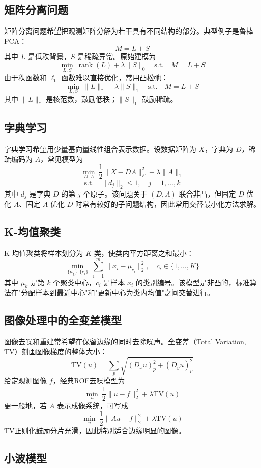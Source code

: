 \subsection{矩阵分离问题}

矩阵分离问题希望把观测矩阵分解为若干具有不同结构的部分。典型例子是鲁棒PCA：
\[
M=L+S
\]
其中 $L$ 是低秩背景，$S$ 是稀疏异常。原始建模为
\[
\min_{L,S}\ \operatorname{rank}(L)+\lambda\|S\|_0
\quad \text{s.t.}\quad M=L+S
\]
由于秩函数和 $\ell_0$ 函数难以直接优化，常用凸松弛：
\[
\min_{L,S}\ \|L\|_*+\lambda\|S\|_1
\quad \text{s.t.}\quad M=L+S
\]
其中 $\|L\|_*$ 是核范数，鼓励低秩；$\|S\|_1$ 鼓励稀疏。

\subsection{字典学习}

字典学习希望用少量基向量线性组合表示数据。设数据矩阵为 $X$，字典为 $D$，稀疏编码为 $A$，常见模型为
\[
\min_{D,A}\ \frac{1}{2}\|X-DA\|_F^2+\lambda\|A\|_1
\]
\[
\text{s.t.}\quad \|d_j\|_2\leq1,\quad j=1,\ldots,k
\]
其中 $d_j$ 是字典 $D$ 的第 $j$ 个原子。该问题关于 $(D,A)$ 联合非凸，但固定 $D$ 优化 $A$、固定 $A$ 优化 $D$ 时常有较好的子问题结构，因此常用交替最小化方法求解。

\subsection{K-均值聚类}

K-均值聚类将样本划分为 $K$ 类，使类内平方距离之和最小：
\[
\min_{\{\mu_k\},\{c_i\}}\ \sum_{i=1}^{m}\|x_i-\mu_{c_i}\|_2^2,\quad c_i\in\{1,\ldots,K\}
\]
其中 $\mu_k$ 是第 $k$ 个聚类中心，$c_i$ 是样本 $x_i$ 的类别编号。该模型是非凸的，标准算法在"分配样本到最近中心"和"更新中心为类内均值"之间交替进行。

\subsection{图像处理中的全变差模型}

图像去噪和重建常希望在保留边缘的同时去除噪声。全变差（Total Variation, TV）刻画图像梯度的整体大小：
\[
\mathrm{TV}(u)=\sum_p \sqrt{(D_xu)_p^2+(D_yu)_p^2}
\]
给定观测图像 $f$，经典ROF去噪模型为
\[
\min_u\ \frac{1}{2}\|u-f\|_2^2+\lambda \mathrm{TV}(u)
\]
更一般地，若 $A$ 表示成像系统，可写成
\[
\min_u\ \frac{1}{2}\|Au-f\|_2^2+\lambda \mathrm{TV}(u)
\]
TV正则化鼓励分片光滑，因此特别适合边缘明显的图像。

\subsection{小波模型}

